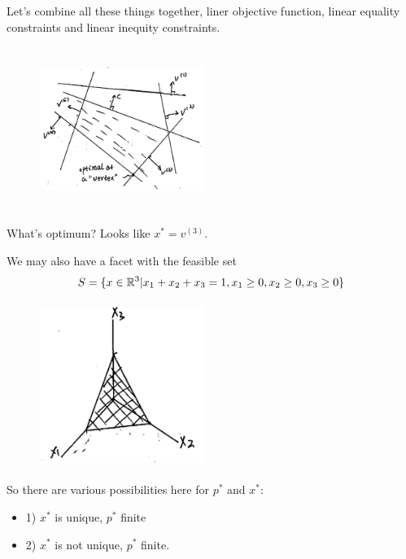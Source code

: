 \begin{example}
	Let's combine all these things together, liner objective function, linear equality constraints and linear inequity constraints.
	
	\begin{figure}
		\centering
		\includegraphics[width=2.1in,height=2.1in]{figures/ch07/figure1012_6.png}
	\end{figure}
	
	What's optimum? Looks like $x^*=v^{(3)}$.
	
	
	\vspace{0.5cm}
	We may also have a facet with the feasible set 
	$$S = \{x\in \mathbb{R}^3 | x_1 +x_2+x_3 = 1, x_1 \geq 0, x_2\geq 0,x_3\geq 0\}$$
	
	
	\begin{figure}
		\centering
		\includegraphics[width=2.1in,height=2.1in]{figures/ch07/figure1012_7.png}
	\end{figure}
	
	So there are various possibilities here for $p^*$ and  $x^* $:
	
	\begin{itemize}
		\item 1) $x^*$ is unique, $p^*$ finite
		
		\item 2) $x^*$ is not unique, $p^*$ finite. 
		

\end{itemize}
\end{example}

